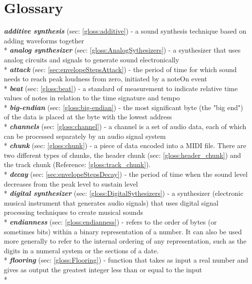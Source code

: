 \documentclass[runningheads]{llncs}
\begin{document}
\section*{Glossary}
\textbf{\textit{additive synthesis}} (sec: \ref{gloss:additive}) - a sound synthesis technique based on adding waveforms together\\*
\textbf{\textit{analog synthesizer}} (sec: \ref{gloss:AnalogSythesizers}) - a synthesizer that uses analog circuits and signals to generate sound electronically\\*
\textbf{\textit{attack}} (sec: \ref{sec:envelopeStepsAttack}) - the period of time for which sound needs to reach peak loudness from zero, initiated by a noteOn event\\*
\textbf{\textit{beat}} (sec: \ref{gloss:beat}) - a standard of measurement to indicate relative time values of notes in relation to the time signature and tempo\\*
\textbf{\textit{big-endian}} (sec: \ref{gloss:big-endian}) - the most significant byte (the "big end") of the data is placed at the byte with the lowest address\\*
\textbf{\textit{channels}} (sec: \ref{gloss:channel}) - a channel is a set of audio data, each of which can be processed separately by an audio signal system\\*
\textbf{\textit{chunk}} (sec: \ref{gloss:chunk}) - a piece of data encoded into a MIDI file. There are two different types of chunks, the header chunk (sec: \ref{gloss:header_chunk}) and the track chunk (Reference: \ref{gloss:track_chunk}).\\*
\textbf{\textit{decay}} (sec: \ref{sec:envelopeStepsDecay}) - the period of time when the sound level decreases from the peak level to sustain level\\*
\textbf{\textit{digital synthesizer}} (sec: \ref{gloss:DigitalSythesizers}) - a synthesizer (electronic musical instrument that generates audio signals) that uses digital signal processing techniques to create musical sounds\\*
\textbf{\textit{endianness}} (sec: \ref{gloss:endianness}) - refers to the order of bytes (or sometimes bits) within a binary representation of a number. It can also be used more generally to refer to the internal ordering of any representation, such as the digits in a numeral system or the sections of a date.\\*
\textbf{\textit{flooring}} (sec: \ref{gloss:Flooring}) - function that takes as input a real number and gives as output the greatest integer less than or equal to the input\\*
\end{document}
